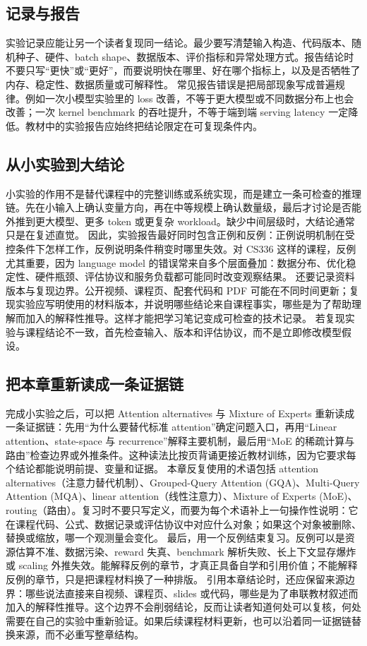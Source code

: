 \documentclass[a4paper]{article}
\begin{document}
\subsection{记录与报告}
实验记录应能让另一个读者复现同一结论。最少要写清楚输入构造、代码版本、随机种子、硬件、batch shape、数据版本、评价指标和异常处理方式。报告结论时不要只写“更快”或“更好”，而要说明快在哪里、好在哪个指标上，以及是否牺牲了内存、稳定性、数据质量或可解释性。
常见报告错误是把局部现象写成普遍规律。例如一次小模型实验里的 loss 改善，不等于更大模型或不同数据分布上也会改善；一次 kernel benchmark 的吞吐提升，不等于端到端 serving latency 一定降低。教材中的实验报告应始终把结论限定在可复现条件内。
\subsection{从小实验到大结论}
小实验的作用不是替代课程中的完整训练或系统实现，而是建立一条可检查的推理链。先在小输入上确认变量方向，再在中等规模上确认数量级，最后才讨论是否能外推到更大模型、更多 token 或更复杂 workload。缺少中间层级时，大结论通常只是在复述直觉。
因此，实验报告最好同时包含正例和反例：正例说明机制在受控条件下怎样工作，反例说明条件稍变时哪里失效。对 CS336 这样的课程，反例尤其重要，因为 language model 的错误常来自多个层面叠加：数据分布、优化稳定性、硬件瓶颈、评估协议和服务负载都可能同时改变观察结果。
还要记录资料版本与复现边界。公开视频、课程页、配套代码和 PDF 可能在不同时间更新；复现实验应写明使用的材料版本，并说明哪些结论来自课程事实，哪些是为了帮助理解而加入的解释性推导。这样才能把学习笔记变成可检查的技术记录。
若复现实验与课程结论不一致，首先检查输入、版本和评估协议，而不是立即修改模型假设。
\subsection{把本章重新读成一条证据链}
完成小实验之后，可以把 Attention alternatives 与 Mixture of Experts 重新读成一条证据链：先用“为什么要替代标准 attention”确定问题入口，再用“Linear attention、state-space 与 recurrence”解释主要机制，最后用“MoE 的稀疏计算与路由”检查边界或外推条件。这种读法比按页背诵更接近教材训练，因为它要求每个结论都能说明前提、变量和证据。
本章反复使用的术语包括 attention alternatives（注意力替代机制）、Grouped-Query Attention (GQA)、Multi-Query Attention (MQA)、linear attention（线性注意力）、Mixture of Experts (MoE)、routing（路由）。复习时不要只写定义，而要为每个术语补上一句操作性说明：它在课程代码、公式、数据记录或评估协议中对应什么对象；如果这个对象被删除、替换或缩放，哪一个观测量会变化。
最后，用一个反例结束复习。反例可以是资源估算不准、数据污染、reward 失真、benchmark 解析失败、长上下文显存爆炸或 scaling 外推失效。能解释反例的章节，才真正具备自学和引用价值；不能解释反例的章节，只是把课程材料换了一种排版。
引用本章结论时，还应保留来源边界：哪些说法直接来自视频、课程页、slides 或代码，哪些是为了串联教材叙述而加入的解释性推导。这个边界不会削弱结论，反而让读者知道何处可以复核，何处需要在自己的实验中重新验证。如果后续课程材料更新，也可以沿着同一证据链替换来源，而不必重写整章结构。
\end{document}
